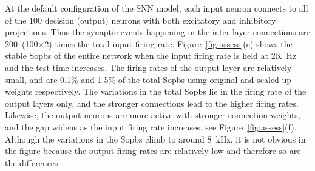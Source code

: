 At the default configuration of the SNN model, each input neuron connects to all of the 100 decision (output) neurons with both excitatory and inhibitory projections.
Thus the synaptic events happening in the inter-layer connections are 200~(100$\times$2) times the total input firing rate.
Figure~\ref{fig:assess}(e) shows the stable Sopbs of the entire network when the input firing rate is held at 2K~Hz and the test time increases.
The firing rates of the output layer are relatively small, and are 0.1\% and 1.5\% of the total Sopbs using original and scaled-up weights respectively.
The variations in the total Sopbs lie in the firing rate of the output layers only, and the stronger connections lead to the higher firing rates.
Likewise, the output neurons are more active with stronger connection weights, and the gap widens as the input firing rate increases, see Figure~\ref{fig:assess}(f).
Although the variations in the Sopbs climb to around 8~kHz, it is not obvious in the figure because the output firing rates are relatively low and therefore so are the differences.


